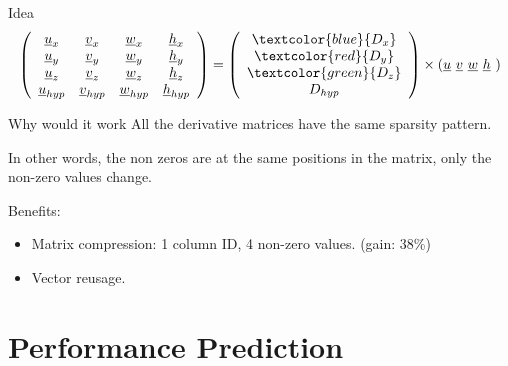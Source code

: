 \documentclass{beamer}
\begin{document}
\begin{frame}
  \begin{block}{Idea}
    \scriptsize
    \begin{equation}
      \left( \begin{array}{cccc}
          \underline{u}_x     & \underline{v}_x     & \underline{w}_x     & \underline{h}_x \\
          \underline{u}_y     & \underline{v}_y     & \underline{w}_y     & \underline{h}_y \\
          \underline{u}_z     & \underline{v}_z     & \underline{w}_z     & \underline{h}_z \\
          \underline{u}_{hyp} & \underline{v}_{hyp} & \underline{w}_{hyp} & \underline{h}_{hyp}
        \end{array} \right)
      = \left(
        \begin{array}{c}
          \textcolor{blue}{D_{x}}\\ \textcolor{red}{D_{y}}\\ \textcolor{green}{D_{z}}\\ D_{hyp}
        \end{array}\right)
      \times \left(\underline{u} \,\, \underline{v} \,\, \underline{w} \,\, \underline{h} \,\,\right) \nonumber
      \vspace{-1ex}
    \end{equation}
  \end{block}  
  
\pause
    
  \begin{block}{Why would it work}
    All the derivative matrices have the same sparsity pattern.

    In other words, the non zeros are at the same positions in the
    matrix, only the non-zero values change.

    Benefits:
    \begin{itemize}
    \item Matrix compression: 1 column ID, 4 non-zero values. (gain: 38\%)
    \item Vector reusage.
    \end{itemize}
  \end{block}
\end{frame}

\section{Performance Prediction}
\end{document}
